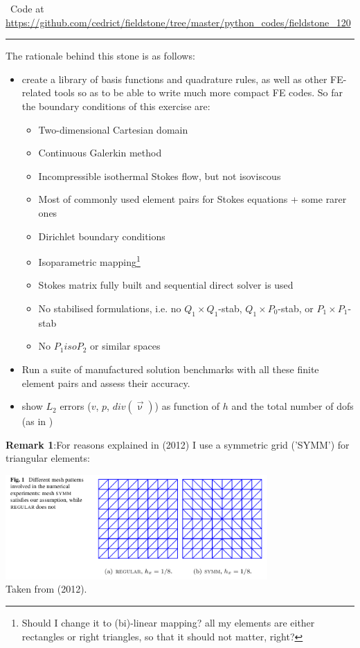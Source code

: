 %

\begin{center}
\inpython~Code at \url{https://github.com/cedrict/fieldstone/tree/master/python_codes/fieldstone_120}
\end{center}

\par\noindent\rule{\textwidth}{0.4pt}


The rationale behind this stone is as follows:
\begin{itemize}
\item create a library of basis functions and quadrature rules, as well as 
other FE-related tools so as to be able to write much more compact FE codes. 
So far the boundary conditions of this exercise are:
\begin{itemize}
\item Two-dimensional Cartesian domain
\item Continuous Galerkin method
\item Incompressible isothermal Stokes flow, but not isoviscous
\item Most of commonly used element pairs for Stokes equations + some rarer ones 
\item Dirichlet boundary conditions 
\item Isoparametric mapping\footnote{Should I change it to (bi)-linear mapping? all my elements are either 
rectangles or right triangles, so that it should not matter, right?  }
\item Stokes matrix fully built and sequential direct solver is used
\item No stabilised formulations, i.e. no $Q_1\times Q_1$-stab, $Q_1\times P_0$-stab, or 
      $P_1\times P_1$-stab
\item No $P_1isoP_2$ or similar spaces
\end{itemize}
\item Run a suite of manufactured solution benchmarks with all 
these finite element pairs and assess their accuracy.
\item show $L_2$ errors ($v$, $p$, $div(\vec\upnu)$) as function of $h$ and the total number of dofs (as in \cite{cakp15})
\end{itemize}


{\bf Remark 1}:For reasons explained in \textcite{bocg12} (2012) I use 
a symmetric grid ('SYMM') for triangular elements:
\begin{center} 
\includegraphics[width=10cm]{python_codes/fieldstone_120/images/bocg12}\\
{\captionfont Taken from \textcite{bocg12} (2012).}
\end{center} 


